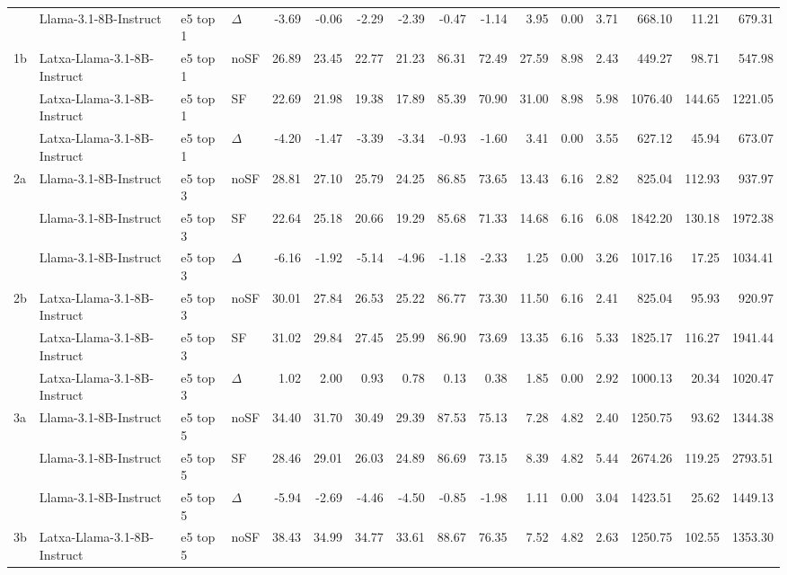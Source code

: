 \begin{landscape}
\begin{footnotesize}
\begin{longtable}{l l l l r r r r r r r r r r r r}
 & Llama-3.1-8B-Instruct & e5 top 1 & $\Delta$ & -3.69 & -0.06 & -2.29 & -2.39 & -0.47 & -1.14 & 3.95 & 0.00 & 3.71 & 668.10 & 11.21 & 679.31 \\
1b & Latxa-Llama-3.1-8B-Instruct & e5 top 1 & noSF & 26.89 & 23.45 & 22.77 & 21.23 & 86.31 & 72.49 & 27.59 & 8.98 & 2.43 & 449.27 & 98.71 & 547.98 \\
 & Latxa-Llama-3.1-8B-Instruct & e5 top 1 & SF & 22.69 & 21.98 & 19.38 & 17.89 & 85.39 & 70.90 & 31.00 & 8.98 & 5.98 & 1076.40 & 144.65 & 1221.05 \\
 & Latxa-Llama-3.1-8B-Instruct & e5 top 1 & $\Delta$ & -4.20 & -1.47 & -3.39 & -3.34 & -0.93 & -1.60 & 3.41 & 0.00 & 3.55 & 627.12 & 45.94 & 673.07 \\
\midrule
2a & Llama-3.1-8B-Instruct & e5 top 3 & noSF & 28.81 & 27.10 & 25.79 & 24.25 & 86.85 & 73.65 & 13.43 & 6.16 & 2.82 & 825.04 & 112.93 & 937.97 \\
 & Llama-3.1-8B-Instruct & e5 top 3 & SF & 22.64 & 25.18 & 20.66 & 19.29 & 85.68 & 71.33 & 14.68 & 6.16 & 6.08 & 1842.20 & 130.18 & 1972.38 \\
 & Llama-3.1-8B-Instruct & e5 top 3 & $\Delta$ & -6.16 & -1.92 & -5.14 & -4.96 & -1.18 & -2.33 & 1.25 & 0.00 & 3.26 & 1017.16 & 17.25 & 1034.41 \\
2b & Latxa-Llama-3.1-8B-Instruct & e5 top 3 & noSF & 30.01 & 27.84 & 26.53 & 25.22 & 86.77 & 73.30 & 11.50 & 6.16 & 2.41 & 825.04 & 95.93 & 920.97 \\
 & Latxa-Llama-3.1-8B-Instruct & e5 top 3 & SF & 31.02 & 29.84 & 27.45 & 25.99 & 86.90 & 73.69 & 13.35 & 6.16 & 5.33 & 1825.17 & 116.27 & 1941.44 \\
 & Latxa-Llama-3.1-8B-Instruct & e5 top 3 & $\Delta$ & 1.02 & 2.00 & 0.93 & 0.78 & 0.13 & 0.38 & 1.85 & 0.00 & 2.92 & 1000.13 & 20.34 & 1020.47 \\
\midrule
3a & Llama-3.1-8B-Instruct & e5 top 5 & noSF & 34.40 & 31.70 & 30.49 & 29.39 & 87.53 & 75.13 & 7.28 & 4.82 & 2.40 & 1250.75 & 93.62 & 1344.38 \\
 & Llama-3.1-8B-Instruct & e5 top 5 & SF & 28.46 & 29.01 & 26.03 & 24.89 & 86.69 & 73.15 & 8.39 & 4.82 & 5.44 & 2674.26 & 119.25 & 2793.51 \\
 & Llama-3.1-8B-Instruct & e5 top 5 & $\Delta$ & -5.94 & -2.69 & -4.46 & -4.50 & -0.85 & -1.98 & 1.11 & 0.00 & 3.04 & 1423.51 & 25.62 & 1449.13 \\
3b & Latxa-Llama-3.1-8B-Instruct & e5 top 5 & noSF & 38.43 & 34.99 & 34.77 & 33.61 & 88.67 & 76.35 & 7.52 & 4.82 & 2.63 & 1250.75 & 102.55 & 1353.30 \\

\end{longtable}
\end{footnotesize}
\end{landscape}

